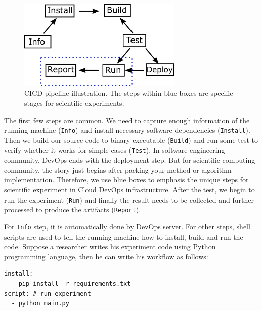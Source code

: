 \documentclass{IEEEcsmag}
\begin{document}
\begin{figure}[!ht]
\centerline{\includegraphics[width=18.5pc]{workflow.pdf}}
\caption{CICD pipeline illustration. The steps within blue boxes are specific stages for scientific experiments. }\label{fig:cicdworkflow}
\end{figure}

The first few steps are common. We need to capture enough information of the running machine (\texttt{Info}) and install necessary software dependencies (\texttt{Install}). Then we build our source code to binary executable (\texttt{Build}) and run some test to verify whether it works for simple cases (\texttt{Test}). In software engineering community, DevOps ends with the deployment step. But for scientific computing community, the story just begins after packing your method or algorithm implementation. Therefore, we use blue boxes to emphasis the unique steps for scientific experiment in Cloud DevOps infrastructure. After the test, we begin to run the experiment (\texttt{Run}) and finally the result needs to be collected and further processed to produce the artifacts (\texttt{Report}).

For \texttt{Info} step, it is automatically done by DevOps server. For other steps, shell scripts are used to tell the running machine how to install, build and run the code. Suppose a researcher writes his experiment code using Python programming language, then he can write his workflow as follows:
\begin{lstlisting}[caption={workflow description}, label={lst:wd}]
install: 
  - pip install -r requirements.txt
script: # run experiment
  - python main.py
\end{lstlisting}
\end{document}
